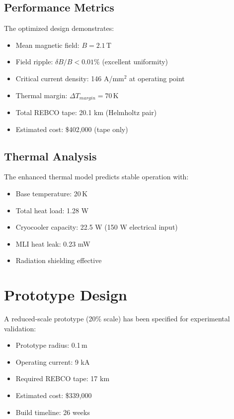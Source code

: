 \documentclass[12pt,a4paper]{article}
\begin{document}
\subsection{Performance Metrics}

The optimized design demonstrates:
\begin{itemize}
\item Mean magnetic field: $B = 2.1\,$T
\item Field ripple: $\delta B / B < 0.01\%$ (excellent uniformity)
\item Critical current density: 146 A/mm$^2$ at operating point
\item Thermal margin: $\Delta T_{margin} = 70\,$K
\item Total REBCO tape: 20.1 km (Helmholtz pair)
\item Estimated cost: \$402,000 (tape only)
\end{itemize}

\subsection{Thermal Analysis}

The enhanced thermal model predicts stable operation with:
\begin{itemize}
\item Base temperature: 20\,K
\item Total heat load: 1.28 W
\item Cryocooler capacity: 22.5 W (150 W electrical input)
\item MLI heat leak: 0.23 mW
\item Radiation shielding effective
\end{itemize}

\section{Prototype Design}

A reduced-scale prototype (20\% scale) has been specified for experimental validation:
\begin{itemize}
\item Prototype radius: 0.1\,m
\item Operating current: 9 kA
\item Required REBCO tape: 17 km
\item Estimated cost: \$339,000
\item Build timeline: 26 weeks
\end{itemize}
\end{document}
